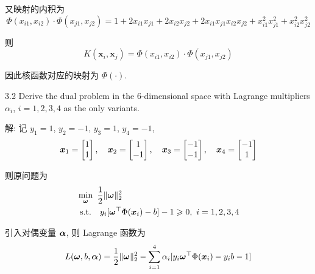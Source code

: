 \documentclass{article}
\begin{document}
又映射的内积为
\begin{equation}
  \Phi(x_{i1},x_{i2})\cdot\Phi(x_{j1},x_{j2})
  =1+2x_{i1}x_{j1}+2x_{i2}x_{j2}+2x_{i1}x_{j1}x_{i2}x_{j2}+x_{i1}^2x_{j1}^2+x_{i2}^2x_{j2}^2
\end{equation}

则
\begin{equation}
  K(\bm{x}_i,\bm{x}_j)=\Phi(x_{i1},x_{i2})\cdot\Phi(x_{j1},x_{j2})
\end{equation}

因此核函数对应的映射为 $\Phi(\cdot)$.

3.2 Derive the dual problem in the 6-dimensional space with Lagrange multipliers $\alpha_i$, $i=1,2,3,4$ as the only variants.

解: 记 $y_1=1$, $y_2=-1$, $y_3=1$, $y_4=-1$, 
\begin{equation}
  \bm{x}_1=
  \begin{bmatrix}
    1\\ 1\\
  \end{bmatrix},\quad
  \bm{x}_2=
  \begin{bmatrix}
    1\\ -1\\
  \end{bmatrix},\quad
  \bm{x}_3=
  \begin{bmatrix}
    -1\\ -1\\
  \end{bmatrix},\quad
  \bm{x}_4=
  \begin{bmatrix}
    -1\\ 1\\
  \end{bmatrix}
\end{equation}

则原问题为
\begin{equation}
  \begin{aligned}
    &\min_{\bm{\omega}}~\frac{1}{2}\|\bm{\omega}\|_2^2 \\
    &~\mathrm{s.t.}~~~y_i[\bm{\omega}^{\top}\Phi(\bm{x}_i)-b]-1\geqslant0,~i=1,2,3,4
  \end{aligned}
\end{equation}

引入对偶变量 $\bm{\alpha}$, 则 Lagrange 函数为
\begin{equation}
  L(\bm{\omega},b,\bm{\alpha})=\frac{1}{2}\|\bm{\omega}\|_2^2-\sum_{i=1}^4\alpha_i[y_i\bm{\omega}^{\top}\Phi(\bm{x}_i)-y_ib-1]
\end{equation}
\end{document}
